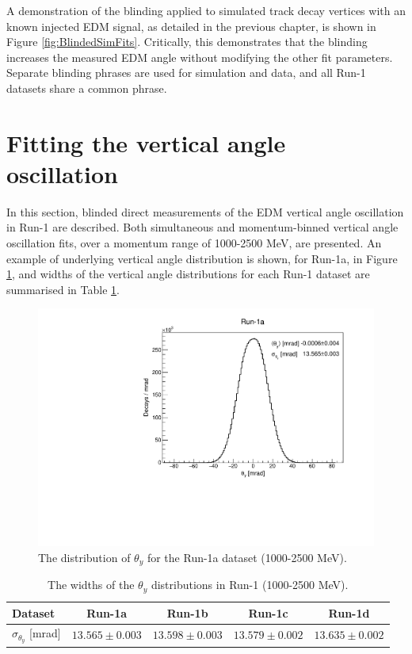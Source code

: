 A demonstration of the blinding applied to simulated track decay vertices with an known injected EDM signal, as detailed in the previous chapter, is shown in Figure \ref{fig:BlindedSimFits}. Critically, this demonstrates that the blinding increases the measured EDM angle without modifying the other fit parameters. Separate blinding phrases are used for simulation and data, and all Run-1 datasets share a common phrase.

\section{Fitting the vertical angle oscillation}\label{sec:Run1Fits}

In this section, blinded direct measurements of the EDM vertical angle oscillation in Run-1 are described. Both simultaneous and momentum-binned vertical angle oscillation fits, over a momentum range of 1000-2500 MeV, are presented. An example of underlying vertical angle distribution is shown, for Run-1a, in Figure \ref{fig:Run1aThetaY}, and widths of the vertical angle distributions for each Run-1 dataset are summarised in Table \ref{tbl:Run1aThetaY}.

\begin{figure}[h!]
\centering{}
\includegraphics[trim={0 0 0 1cm},clip,width=.65\textwidth]{Images/Chapter6/ThetaY_Run-1a.pdf}
\caption{The distribution of $\theta_{y}$ for the Run-1a dataset (1000-2500 MeV).}
\label{fig:Run1aThetaY}
\end{figure} 

\begin{table}[h!]
\centering{}
\begin{tabular}{l|cccc}
\hline
\hline
Dataset & Run-1a & Run-1b & Run-1c & Run-1d \\ 
\hline
$\sigma_{\theta_{y}}$ [mrad] & $13.565\pm0.003$ & $13.598\pm0.003$ & $13.579\pm0.002$ & $13.635\pm0.002$ \\ 
\hline
\hline
\end{tabular}
\caption{The widths of the $\theta_{y}$ distributions in Run-1 (1000-2500 MeV).} 
\label{tbl:Run1aThetaY}
\end{table}

